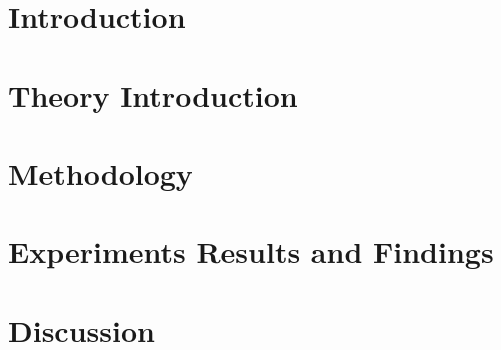 \chapter{Introduction}\label{ch:introduction}


\chapter{Theory Introduction}\label{ch:first_chapter}


\chapter{Methodology}\label{ch:second_chapter}


\chapter{Experiments Results and Findings}\label{ch:experiments}


\chapter{Discussion}\label{ch:impl-bench}


%
